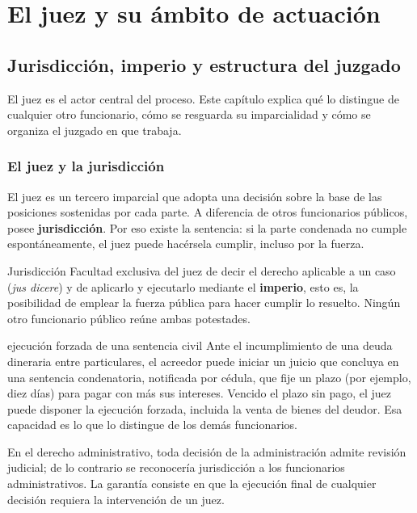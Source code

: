 \documentclass[12pt,oneside]{book}
\begin{document}
\part{El juez y su ámbito de actuación}

\chapter{Jurisdicción, imperio y estructura del juzgado}\label{cap:juez}

El juez es el actor central del proceso. Este capítulo explica qué lo distingue de cualquier otro funcionario, cómo se resguarda su imparcialidad y cómo se organiza el juzgado en que trabaja.

\section{El juez y la jurisdicción}\label{sec:jurisdiccion}

El juez es un tercero imparcial que adopta una decisión sobre la base de las posiciones sostenidas por cada parte. A diferencia de otros funcionarios públicos, posee \textbf{jurisdicción}. Por eso existe la sentencia: si la parte condenada no cumple espontáneamente, el juez puede hacérsela cumplir, incluso por la fuerza.

\begin{definicion}{Jurisdicción}
Facultad exclusiva del juez de decir el derecho aplicable a un caso (\emph{jus dicere}) y de aplicarlo y ejecutarlo mediante el \textbf{imperio}, esto es, la posibilidad de emplear la fuerza pública para hacer cumplir lo resuelto. Ningún otro funcionario público reúne ambas potestades.
\end{definicion}

\begin{ejemplo}{ejecución forzada de una sentencia civil}
Ante el incumplimiento de una deuda dineraria entre particulares, el acreedor puede iniciar un juicio que concluya en una sentencia condenatoria, notificada por cédula, que fije un plazo (por ejemplo, diez días) para pagar con más sus intereses. Vencido el plazo sin pago, el juez puede disponer la ejecución forzada, incluida la venta de bienes del deudor. Esa capacidad es lo que lo distingue de los demás funcionarios.
\end{ejemplo}

En el derecho administrativo, toda decisión de la administración admite revisión judicial; de lo contrario se reconocería jurisdicción a los funcionarios administrativos. La garantía consiste en que la ejecución final de cualquier decisión requiera la intervención de un juez.
\end{document}
